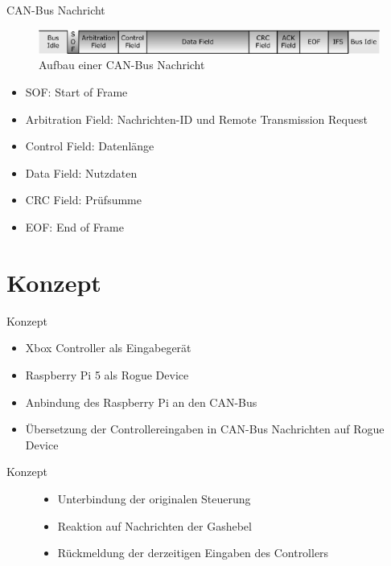 \documentclass[usenames, dvipsnames, aspectratio=75]{beamer}
\begin{document}
\begin{frame}{CAN-Bus Nachricht}
    \begin{figure}
        \centering
        \includegraphics[width=0.9\linewidth]{assets/canMessage.png}
        \caption{Aufbau einer CAN-Bus Nachricht}
    \end{figure}
    \begin{itemize}
        \item SOF: Start of Frame
        \item Arbitration Field: Nachrichten-ID und Remote Transmission Request
        \item Control Field: Datenlänge
        \item Data Field: Nutzdaten
        \item CRC Field: Prüfsumme
        \item EOF: End of Frame
    \end{itemize}
\end{frame}

\section{Konzept}
\begin{frame}{Konzept}
    \begin{itemize}
        \item Xbox Controller als Eingabegerät
        \item Raspberry Pi 5 als Rogue Device
        \item Anbindung des Raspberry Pi an den CAN-Bus
        \item Übersetzung der Controllereingaben in CAN-Bus Nachrichten auf Rogue Device
    \end{itemize}
\end{frame}

\begin{frame}{Konzept}
    \begin{figure}
        \begin{itemize}
            \item Unterbindung der originalen Steuerung
            \item Reaktion auf Nachrichten der Gashebel
            \item Rückmeldung der derzeitigen Eingaben des Controllers
        \end{itemize}
    \end{figure}
\end{frame}
\end{document}
